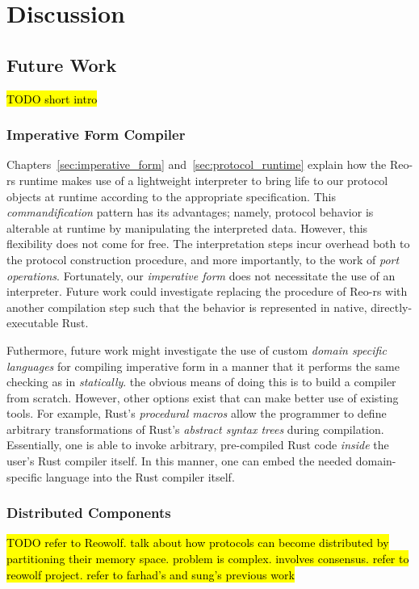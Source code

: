 \chapter{Discussion}
\label{sec:discussion}
\section{Future Work}
\hl{TODO short intro}
\subsection{Imperative Form Compiler}
Chapters~\ref{sec:imperative_form} and~\ref{sec:protocol_runtime} explain how the Reo-rs runtime makes use of a lightweight interpreter to bring life to our protocol objects at runtime according to the appropriate specification. This \textit{commandification} pattern has its advantages; namely, protocol behavior is alterable at runtime by manipulating the interpreted data. However, this flexibility does not come for free. The interpretation steps incur overhead both to the protocol construction procedure, and more importantly, to the work of \textit{port operations}. Fortunately, our \textit{imperative form} does not necessitate the use of an interpreter. Future work could investigate replacing the  procedure of Reo-rs with another compilation step such that the behavior is represented in native, directly-executable Rust. 

Futhermore, future work might investigate the use of custom \textit{domain specific languages} for compiling imperative form in a manner that it performs the same checking as in  \textit{statically}. the obvious means of doing this is to build a compiler from scratch. However, other options exist that can make better use of existing tools. For example, Rust's \textit{procedural macros} allow the programmer to define arbitrary transformations of Rust's \textit{abstract syntax trees} during compilation. Essentially, one is able to invoke arbitrary, pre-compiled Rust code \textit{inside} the user's Rust compiler itself. In this manner, one can embed the needed domain-specific language into the Rust compiler itself.

\subsection{Distributed Components}
\hl{TODO refer to Reowolf. talk about how protocols can become distributed by partitioning their memory space. problem is complex. involves consensus. refer to reowolf project. refer to farhad's and sung's previous work}
